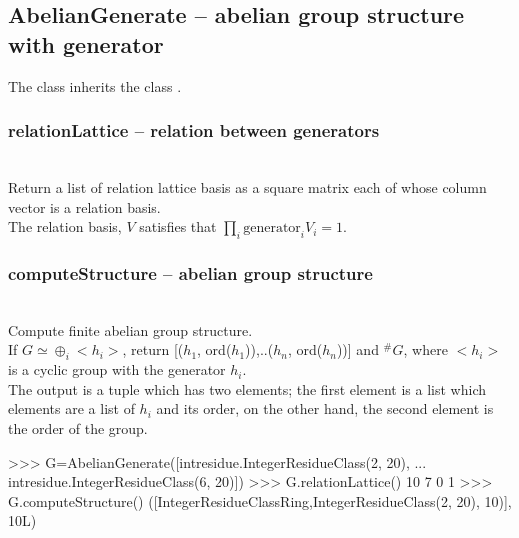 \subsection{AbelianGenerate -- abelian group structure with generator}
 \initialize
  \quad The class inherits the class .\\
  
  \subsubsection{relationLattice -- relation between generators}
   \\
   \spacing
   \quad Return a list of relation lattice basis as a square matrix each of whose column vector is a relation basis.\\
   \spacing
   \quad The relation basis, $V$ satisfies that $\prod_{i} \mbox{generator}_i V_i=1$.
   \spacing
  \subsubsection{computeStructure -- abelian group structure}
   \\
   \spacing
   \quad Compute finite abelian group structure.\\
   \spacing
   \quad If  $G \simeq \oplus_i <h_i>$, return [($h_1$, ord($h_1$)),..($h_n$, ord($h_n$))] and $^\# G$,
   where $<h_i>$ is a cyclic group with the generator $h_i$.\\
   \spacing
   \quad The output is a tuple which has two elements;
   the first element is a list which elements are a list of $h_i$ and its order,
   on the other hand, the second element is the order of the group.
\begin{ex}
>>> G=AbelianGenerate([intresidue.IntegerResidueClass(2, 20),
... intresidue.IntegerResidueClass(6, 20)])
>>> G.relationLattice()
10 7
 0 1
>>> G.computeStructure()
([IntegerResidueClassRing,IntegerResidueClass(2, 20), 10)], 10L)
\end{ex}%
\C


